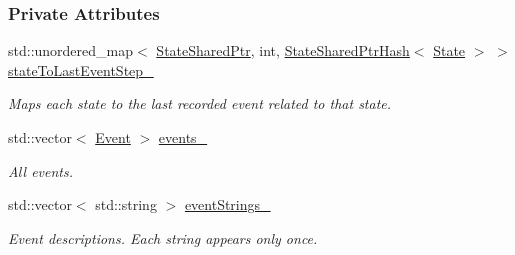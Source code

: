 \subsubsection*{Private Attributes}
\begin{DoxyCompactItemize}
\item 
std\+::unordered\+\_\+map$<$ \hyperlink{structslb_1_1core_1_1ui_1_1AlgorithmLog_acb46cb3c44c97ddbb219e4c0120e87e3}{State\+Shared\+Ptr}, int, \hyperlink{structslb_1_1core_1_1util_1_1StateSharedPtrHash}{State\+Shared\+Ptr\+Hash}$<$ \hyperlink{structslb_1_1core_1_1ui_1_1AlgorithmLog_ac9bad13ba3a1f7a8d1b545a86897b0b4}{State} $>$ $>$ \hyperlink{structslb_1_1core_1_1ui_1_1AlgorithmLog_a0c087245b2b1383ef357f98e7bd503b9}{state\+To\+Last\+Event\+Step\+\_\+}\hypertarget{structslb_1_1core_1_1ui_1_1AlgorithmLog_a0c087245b2b1383ef357f98e7bd503b9}{}\label{structslb_1_1core_1_1ui_1_1AlgorithmLog_a0c087245b2b1383ef357f98e7bd503b9}

\begin{DoxyCompactList}\small\item\em Maps each state to the last recorded event related to that state. \end{DoxyCompactList}\item 
std\+::vector$<$ \hyperlink{structslb_1_1core_1_1ui_1_1AlgorithmLog_aa495893d6c587c69280c82dd4f1684ff}{Event} $>$ \hyperlink{structslb_1_1core_1_1ui_1_1AlgorithmLog_a2367dedb628cd52a3d4f4002e6ff08c9}{events\+\_\+}\hypertarget{structslb_1_1core_1_1ui_1_1AlgorithmLog_a2367dedb628cd52a3d4f4002e6ff08c9}{}\label{structslb_1_1core_1_1ui_1_1AlgorithmLog_a2367dedb628cd52a3d4f4002e6ff08c9}

\begin{DoxyCompactList}\small\item\em All events. \end{DoxyCompactList}\item 
std\+::vector$<$ std\+::string $>$ \hyperlink{structslb_1_1core_1_1ui_1_1AlgorithmLog_a6c8e95b8dfaa6ba38405a5f22d11e838}{event\+Strings\+\_\+}\hypertarget{structslb_1_1core_1_1ui_1_1AlgorithmLog_a6c8e95b8dfaa6ba38405a5f22d11e838}{}\label{structslb_1_1core_1_1ui_1_1AlgorithmLog_a6c8e95b8dfaa6ba38405a5f22d11e838}

\begin{DoxyCompactList}\small\item\em Event descriptions. Each string appears only once. \end{DoxyCompactList}\end{DoxyCompactItemize}


